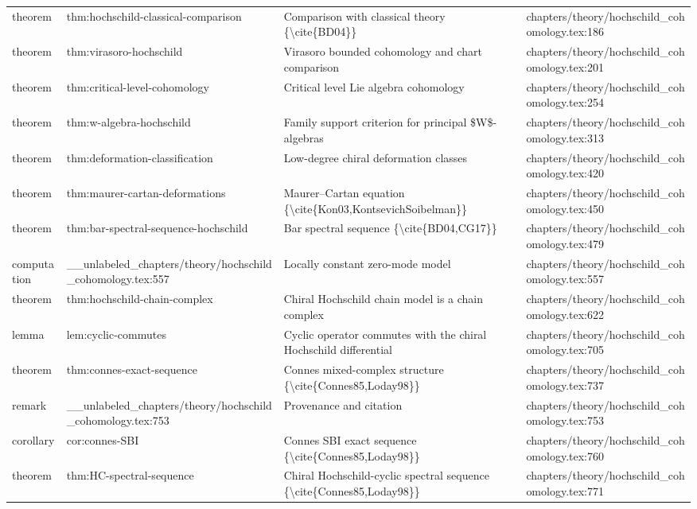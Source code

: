 \documentclass[11pt]{article}
\begin{document}
\begin{longtable}{L{0.10\textwidth}L{0.26\textwidth}L{0.42\textwidth}L{0.22\textwidth}}
theorem & thm:hochschild-classical-comparison & Comparison with classical theory \{\textbackslash{}cite\{BD04\}\} & chapters/theory/hochschild\_cohomology.tex:186\\
theorem & thm:virasoro-hochschild & Virasoro bounded cohomology and chart comparison & chapters/theory/hochschild\_cohomology.tex:201\\
theorem & thm:critical-level-cohomology & Critical level Lie algebra cohomology & chapters/theory/hochschild\_cohomology.tex:254\\
theorem & thm:w-algebra-hochschild & Family support criterion for principal \$W\$-algebras & chapters/theory/hochschild\_cohomology.tex:313\\
theorem & thm:deformation-classification & Low-degree chiral deformation classes & chapters/theory/hochschild\_cohomology.tex:420\\
theorem & thm:maurer-cartan-deformations & Maurer--Cartan equation \{\textbackslash{}cite\{Kon03,KontsevichSoibelman\}\} & chapters/theory/hochschild\_cohomology.tex:450\\
theorem & thm:bar-spectral-sequence-hochschild & Bar spectral sequence \{\textbackslash{}cite\{BD04,CG17\}\} & chapters/theory/hochschild\_cohomology.tex:479\\
computation & \_\_unlabeled\_chapters/theory/hochschild\_cohomology.tex:557 & Locally constant zero-mode model & chapters/theory/hochschild\_cohomology.tex:557\\
theorem & thm:hochschild-chain-complex & Chiral Hochschild chain model is a chain complex & chapters/theory/hochschild\_cohomology.tex:622\\
lemma & lem:cyclic-commutes & Cyclic operator commutes with the chiral Hochschild differential & chapters/theory/hochschild\_cohomology.tex:705\\
theorem & thm:connes-exact-sequence & Connes mixed-complex structure \{\textbackslash{}cite\{Connes85,Loday98\}\} & chapters/theory/hochschild\_cohomology.tex:737\\
remark & \_\_unlabeled\_chapters/theory/hochschild\_cohomology.tex:753 & Provenance and citation & chapters/theory/hochschild\_cohomology.tex:753\\
corollary & cor:connes-SBI & Connes SBI exact sequence \{\textbackslash{}cite\{Connes85,Loday98\}\} & chapters/theory/hochschild\_cohomology.tex:760\\
theorem & thm:HC-spectral-sequence & Chiral Hochschild-cyclic spectral sequence \{\textbackslash{}cite\{Connes85,Loday98\}\} & chapters/theory/hochschild\_cohomology.tex:771\\

\end{longtable}
\end{document}
